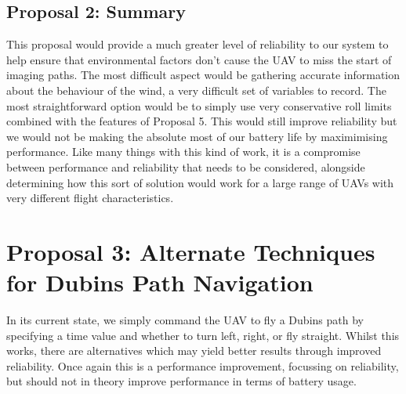 \subsection{Proposal 2: Summary} 
\label{future:tolerancesummary}
This proposal would provide a much greater level of reliability to our system to help ensure that environmental factors don't cause the UAV to miss the start of imaging paths. The most difficult aspect would be gathering accurate information about the behaviour of the wind, a very difficult set of variables to record. The most straightforward option would be to simply use very conservative roll limits combined with the features of Proposal 5. This would still improve reliability but we would not be making the absolute most of our battery life by maximimising performance. Like many things with this kind of work, it is a compromise between performance and reliability that needs to be considered, alongside determining how this sort of solution would work for a large range of UAVs with very different flight characteristics. 

\section{Proposal 3: Alternate Techniques for Dubins Path Navigation} 
\label{future:alternatedubins}
In its current state, we simply command the UAV to fly a Dubins path by specifying a time value and whether to turn left, right, or fly straight. Whilst this works, there are alternatives which may yield better results through improved reliability. Once again this is a performance improvement, focussing on reliability, but should not in theory improve performance in terms of battery usage.

